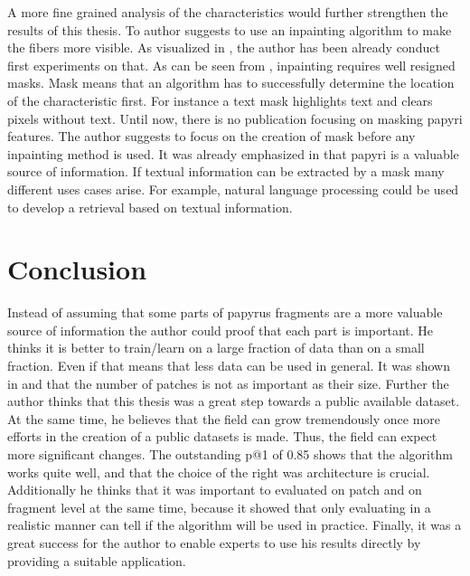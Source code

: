 \noindent A more fine grained analysis of the characteristics would further strengthen the results of this thesis. To author suggests to use an inpainting algorithm to make the fibers more visible. As visualized in , the author has been already conduct first experiments on that. As can be seen from , inpainting requires well resigned masks. Mask means that an algorithm has to successfully determine the location of the characteristic first. For instance a text mask highlights text and clears pixels without text. Until now, there is no publication focusing on masking papyri features. The author suggests to focus on the creation of mask before any inpainting method is used. It was already emphasized in  that papyri is a valuable source of information. If textual information can be extracted by a mask many different uses cases arise. For example, natural language processing could be used to develop a retrieval based on textual information. 

\section{Conclusion}
Instead of assuming that some parts of papyrus fragments are a more valuable source of information the author could proof that each part is important. He thinks it is better to train/learn on a large fraction of data than on a small fraction. Even if that means that less data can be used in general. It was shown in  and  that the number of patches is not as important as their size. Further the author thinks that this thesis was a great step towards a public available dataset. At the same time, he believes that the field can grow tremendously once more efforts in the creation of a public datasets is made. Thus, the field can expect more significant changes. The outstanding \ac{p@1} of 0.85 shows that the algorithm works quite well, and that the choice of the right was architecture is crucial. Additionally he thinks that it was important to evaluated on patch and on fragment level at the same time, because it showed that only evaluating in a realistic manner can tell if the algorithm will  be used in practice. Finally, it was a great success for the author to enable experts to use his results directly by providing a suitable application. 



